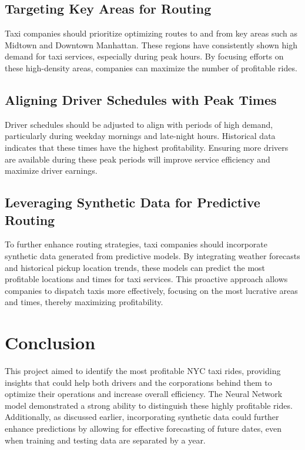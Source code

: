 \documentclass[11pt]{article}
\begin{document}
\subsection{Targeting Key Areas for Routing}

Taxi companies should prioritize optimizing routes to and from key areas such as Midtown and Downtown Manhattan. These regions have consistently shown high demand for taxi services, especially during peak hours. By focusing efforts on these high-density areas, companies can maximize the number of profitable rides.

\subsection{Aligning Driver Schedules with Peak Times}

Driver schedules should be adjusted to align with periods of high demand, particularly during weekday mornings and late-night hours. Historical data indicates that these times have the highest profitability. Ensuring more drivers are available during these peak periods will improve service efficiency and maximize driver earnings.

\subsection{Leveraging Synthetic Data for Predictive Routing}

To further enhance routing strategies, taxi companies should incorporate synthetic data generated from predictive models. By integrating weather forecasts and historical pickup location trends, these models can predict the most profitable locations and times for taxi services. This proactive approach allows companies to dispatch taxis more effectively, focusing on the most lucrative areas and times, thereby maximizing profitability.

\section{Conclusion}

This project aimed to identify the most profitable NYC taxi rides, providing insights that could help both drivers and the corporations behind them to optimize their operations and increase overall efficiency. The Neural Network model demonstrated a strong ability to distinguish these highly profitable rides. Additionally, as discussed earlier, incorporating synthetic data could further enhance predictions by allowing for effective forecasting of future dates, even when training and testing data are separated by a year.



\clearpage

\printbibliography
\end{document}
